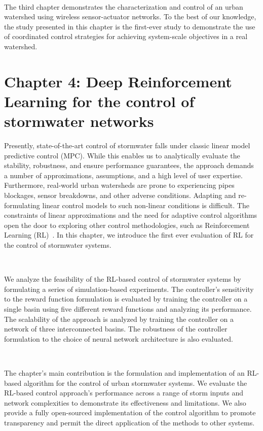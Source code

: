 \

The third chapter demonstrates the characterization and control of an urban watershed using wireless sensor-actuator networks. 
To the best of our knowledge, the study presented in this chapter is the first-ever study to demonstrate the use of coordinated control strategies for achieving system-scale objectives in a real watershed.

\section{Chapter 4: Deep Reinforcement Learning for the control of stormwater networks}

Presently, state-of-the-art control of stormwater falls under classic linear model predictive control (MPC)\cite{Wong_Kerkez_2018}.
While this enables us to analytically evaluate the stability, robustness, and ensure performance guarantees, the approach demands a number of approximations, assumptions, and a high level of user expertise\cite{Wong_Kerkez_2018, Ocampo-Martinez_2015, joseph2014hybrid}.
Furthermore, real-world urban watersheds are prone to experiencing pipes blockages, sensor breakdowns, and other adverse conditions\cite{national2009urban}.
Adapting and re-formulating linear control models to such non-linear conditions is difficult.
The constraints of linear approximations and the need for adaptive control algorithms open the door to exploring other control methodologies, such as Reinforcement Learning (RL)~\cite{Sutton98}.
In this chapter, we introduce the first ever evaluation of RL for the control of stormwater systems.

\

We analyze the feasibility of the RL-based control of stormwater systems by formulating a series of simulation-based experiments.
The controller's sensitivity to the reward function formulation is evaluated by training the controller on a single basin using five different reward functions and analyzing its performance.
The scalability of the approach is analyzed by training the controller on a network of three interconnected basins.
The robustness of the controller formulation to the choice of neural network architecture is also evaluated.


\

The chapter's main contribution is the formulation and implementation of an RL-based algorithm for the control of urban stormwater systems.
We evaluate the RL-based control approach's performance across a range of storm inputs and network complexities to demonstrate its effectiveness and limitations.
We also provide a fully open-sourced implementation of the control algorithm to promote transparency and permit the direct application of the methods to other systems.


